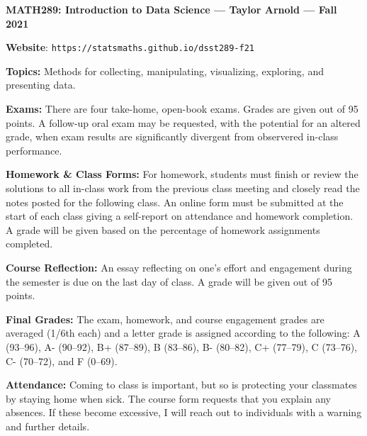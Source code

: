 \documentclass[11pt, a4paper]{article}
\begin{document}
\begin{center}
\textbf{MATH289: Introduction to Data Science --- Taylor Arnold --- Fall 2021}
\end{center}

\vspace{0.5cm}

\textbf{Website}: \texttt{https://statsmaths.github.io/dsst289-f21}

\bigskip

\textbf{Topics:}
Methods for collecting, manipulating, visualizing, exploring, and presenting
data.

\bigskip

\textbf{Exams:}
There are four take-home, open-book exams. Grades are given out of 95 points.
A follow-up oral exam may be requested, with the potential for an altered grade,
when exam results are significantly divergent from observered in-class
performance.

\bigskip

\textbf{Homework \& Class Forms:}
For homework, students must finish or review the solutions to all in-class work
from the previous class meeting and closely read the notes posted for the
following class. An online form must be submitted at the start of each class
giving a self-report on attendance and homework completion. A grade will be
given based on the percentage of homework assignments completed.

\bigskip

\textbf{Course Reflection:}
An essay reflecting on one's effort and engagement during the semester
is due on the last day of class. A grade will be given out of 95 points.

\bigskip

\textbf{Final Grades:}
The exam, homework, and course engagement grades are averaged (1/6th each)
and a letter grade is assigned according to the following:
             A (93--96), A- (90--92),
B+ (87--89), B (83--86), B- (80--82),
C+ (77--79), C (73--76), C- (70--72), and F (0--69).

\bigskip

\textbf{Attendance:}
Coming to class is important, but so is protecting your classmates by staying
home when sick. The course form requests that you explain any absences. If
these become excessive, I will reach out to individuals with a warning and
further details.

\vspace{0.25cm}

\begin{center}
\end{center}
\end{document}
